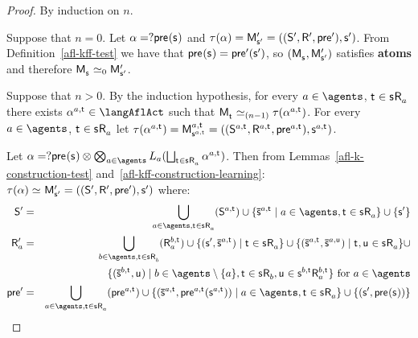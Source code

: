 \begin{proof}
By induction on $n$.

Suppose that $n = 0$. 
Let $\alpha = \test{\aPrecondition(\aStateS)}$ and $\tau(\alpha) = \aPModel[\prime]{\aStateS[\prime]} = \aPModelTuple[\prime]{\aStateS[\prime]}$.
From Definition~\ref{afl-kff-test} we have that $\aPrecondition(\aStateS) = \aPrecondition[\prime](\aStateS[\prime])$, so $(\aPModel{\aStateS}, \aPModel[\prime]{\aStateS[\prime]})$ satisfies {\bf atoms} and therefore $\aPModel{\aStateS} \bisimilar[0] \aPModel[\prime]{\aStateS[\prime]}$.

Suppose that $n > 0$. 
By the induction hypothesis, for every $\agentA \in \agents$, $\aStateT \in \aStateS \aAccessibility{\agentA}$ there exists $\alpha^{\agentA,\aStateT} \in \langAflAct$ such that $\aPModel{\aStateT} \bisimilar[(n - 1)] \tau(\alpha^{\agentA,\aStateT})$.
For every $\agentA \in \agents$, $\aStateT \in \aStateS \aAccessibility{\agentA}$ let $\tau(\alpha^{\agentA,\aStateT}) = \aPModel[\agentA,\aStateT]{\aStateS[\agentA,\aStateT]} = \aPModelTuple[\agentA,\aStateT]{\aStateS[\agentA,\aStateT]}$.

Let $\alpha = \test{\aPrecondition(\aStateS)} \compose \bigcompose_{\agentA \in \agents} \learns_\agentA (\bigchoice_{\aStateT \in \aStateS \aAccessibility{\agentA}} \alpha^{\agentA,\aStateT})$. 
Then from Lemmas~\ref{afl-k-construction-test} and~\ref{afl-kff-construction-learning}: $\tau(\alpha) \bisimilar \aPModel[\prime]{\aStateS[\prime]} = \aPModelTuple[\prime]{\aStateS[\prime]}$ where:
\begin{eqnarray*}
    \aStates[\prime] &=& \bigcup_{\agentA \in \agents, \aStateT \in \aStateS \aAccessibility{\agentA}} (\aStates[\agentA,\aStateT]) \cup \{\aPStateS[\agentA,\aStateT] \mid \agentA \in \agents, \aStateT \in \aStateS \aAccessibility{\agentA}\} \cup \{\aStateS[\prime]\}\\
    \aAccessibility[\prime]{\agentA} &=& \bigcup_{\agentB \in \agents, \aStateT \in \aStateS \aAccessibility{\agentB}} (\aAccessibility[\agentB,\aStateT]{\agentA}) \cup \{(\aStateS[\prime], \aPStateS[\agentA, \aStateT]) \mid \aStateT \in \aStateS \aAccessibility{\agentA}\} \cup \{(\aPStateS[\agentA, \aStateT], \aPStateS[\agentA, \aStateU]) \mid \aStateT, \aStateU \in \aStateS \aAccessibility{\agentA}\} \cup\\
                                               &&\hspace{45pt}\{(\aPStateS[\agentB, \aStateT], \aStateU) \mid \agentB \in \agents \setminus \{\agentA\}, \aStateT \in \aStateS \aAccessibility{\agentB}, \aStateU \in \aStateS[\agentB,\aStateT] \aAccessibility[\agentB,\aStateT]{\agentA}\} \text{ for } \agentA \in \agents\\
    \aPrecondition[\prime] &=& \bigcup_{\agentA \in \agents, \aStateT \in \aStateS \aAccessibility{\agentA}} (\aPrecondition[\agentA,\aStateT]) \cup \{(\aPStateS[\agentA, \aStateT], \aPrecondition[\agentA,\aStateT](\aStateS[\agentA,\aStateT])) \mid \agentA \in \agents, \aStateT \in \aStateS \aAccessibility{\agentA}\} \cup \{(\aStateS[\prime], \aPrecondition(\aStateS))\}
\end{eqnarray*}


\end{proof}
